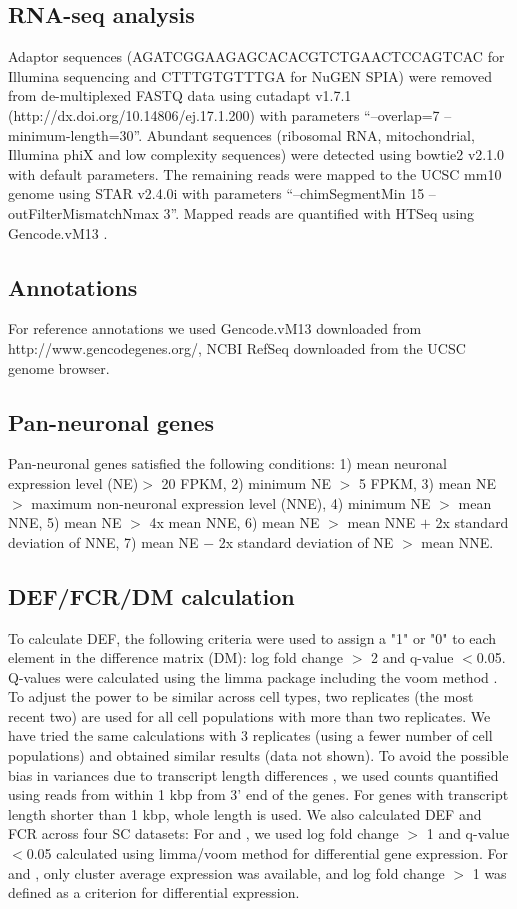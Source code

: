 \subsection{RNA-seq analysis}
Adaptor sequences (AGATCGGAAGAGCACACGTCTGAACTCCAGTCAC for Illumina sequencing and CTTTGTGTTTGA for NuGEN SPIA) were removed from de-multiplexed FASTQ data using cutadapt v1.7.1 (http://dx.doi.org/10.14806/ej.17.1.200) with parameters “--overlap=7 --minimum-length=30”. Abundant sequences (ribosomal RNA, mitochondrial, Illumina phiX and low complexity sequences) were detected using bowtie2 \citep{Langmead_2012} v2.1.0 with default parameters. The remaining reads were mapped to the UCSC mm10 genome using STAR \citep{Dobin_2012} v2.4.0i with parameters “--chimSegmentMin 15 --outFilterMismatchNmax 3”. Mapped reads are quantified with HTSeq \citep{Anders_2014} using Gencode.vM13 \citep{Harrow_2012}.

\subsection{Annotations}
For reference annotations we used Gencode.vM13 \citep{Harrow_2012} downloaded from http://www.gencodegenes.org/, NCBI RefSeq \citep{Pruitt_2013} downloaded from the UCSC genome browser.

\subsection{Pan-neuronal genes}
Pan-neuronal genes satisfied the following conditions: 1) mean neuronal expression level (NE)$>$ 20 FPKM, 2) minimum NE $>$ 5 FPKM, 3) mean NE $>$ maximum non-neuronal expression level (NNE), 4) minimum NE $>$ mean NNE, 5) mean NE $>$ 4x mean NNE, 6) mean NE $>$ mean NNE $+$ 2x standard deviation of NNE, 7) mean NE $-$ 2x standard deviation of NE $>$ mean NNE. 

\subsection{DEF/FCR/DM calculation}
To calculate DEF, the following criteria were used to assign a "1" or "0" to each element in the difference matrix (DM): log fold change $>$ 2 and q-value $<$0.05. Q-values were calculated using the limma package including the voom method \citep{Law_2014}. To adjust the power to be similar across cell types, two replicates (the most recent two) are used for all cell populations with more than two replicates. We have tried the same calculations with 3 replicates (using a fewer number of cell populations) and obtained similar results (data not shown). To avoid the possible bias in variances due to transcript length differences \citep{Oshlack_2009}, we used counts quantified using reads from within 1 kbp from 3' end of the genes. For genes with transcript length shorter than 1 kbp, whole length is used. 
We also calculated DEF and FCR across four SC datasets: For \cite{Zeisel_2015} and \cite{Tasic_2016}, we used log fold change $>$ 1 and q-value $<$0.05 calculated using limma/voom method for differential gene expression. For \cite{Saunders_2018} and \cite{Zeisel_2018}, only cluster average expression was available, and log fold change $>$ 1 was defined as a criterion for differential expression.

